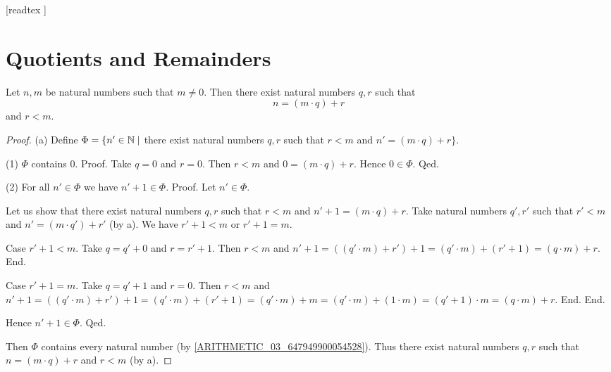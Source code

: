 \documentclass[10pt]{article}
\begin{document}
  \begin{imports}
    \begin{forthel}
      [readtex ]
    \end{forthel}
  \end{imports}


  \section{Quotients and Remainders}

  \begin{forthel}
    \begin{theorem}
      Let $n, m$ be natural numbers such that $m \neq 0$.
      Then there exist natural numbers $q, r$ such that
      \[ n = (m \cdot q) + r \] and $r < m$.
    \end{theorem}
    \begin{proof}
      (a) Define $\Phi = \{ n' \in \mathbb{N} \mid$ there exist natural numbers $q, r$
      such that $r < m$ and $n' = (m \cdot q) + r \}$.

      (1) $\Phi$ contains $0$.
      Proof.
        Take $q = 0$ and $r = 0$.
        Then $r < m$ and $0 = (m \cdot q) + r$.
        Hence $0 \in \Phi$.
      Qed.

      (2) For all $n' \in \Phi$ we have $n' + 1 \in \Phi$.
      Proof.
        Let $n' \in \Phi$.

        Let us show that there exist natural numbers $q, r$ such that $r < m$
        and $n' + 1 = (m \cdot q) + r$.
          Take natural numbers $q', r'$ such that $r' < m$ and $n' = (m \cdot q') + r'$ (by a).
          We have $r' + 1 < m$ or $r' + 1 = m$.

          Case $r' + 1 < m$.
            Take $q = q' + 0$ and $r = r' + 1$. %
            Then $r < m$ and $n' + 1
              = ((q' \cdot m) + r') + 1
              = (q' \cdot m) + (r' + 1)
              = (q \cdot m) + r$.
          End.

          Case $r' + 1 = m$.
            Take  $q = q' + 1$ and $r = 0$.
            Then $r < m$ and
            $n' + 1
              = ((q' \cdot m) + r') + 1
              = (q' \cdot m) + (r' + 1)
              = (q' \cdot m) + m
              = (q' \cdot m) + (1 \cdot m)
              = (q' + 1) \cdot m
              = (q \cdot m) + r$.
          End.
        End.

        Hence $n' + 1 \in \Phi$.
      Qed.

      Then $\Phi$ contains every natural number (by \cref{ARITHMETIC_03_647949900054528}).
      Thus there exist natural numbers $q, r$ such that $n = (m \cdot q) + r$ and $r < m$ (by a).
    \end{proof}
  \end{forthel}
\end{document}
